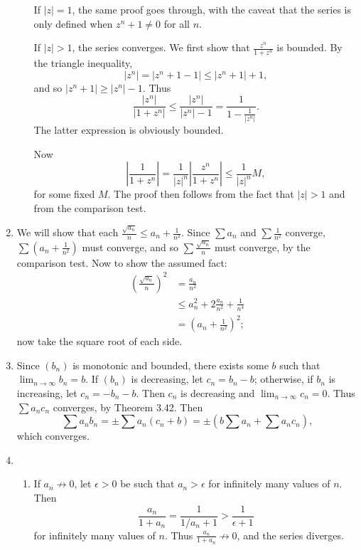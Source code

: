 \documentclass{article}
\begin{document}
\begin{enumerate}[label=\textbf{\arabic*.}]
\begin{enumerate}
If $|z| = 1$, the same proof goes through, with the caveat that the series is only defined when $z^n + 1 \neq 0$ for all $n$.

If $|z| > 1$, the series converges. We first show that $\frac{z^n}{1+z^n}$ is bounded. By the triangle inequality, \[|z^n| = |z^n + 1 - 1| \leq |z^n + 1| + 1,\] and so $|z^n + 1| \geq |z^n| - 1$. Thus \[\frac{|z^n|}{|1+z^n|} \leq \frac{|z^n|}{|z^n| - 1} = \frac{1}{1 - \frac{1}{|z^n|}}.\] The latter expression is obviously bounded.

Now \[\left|\frac{1}{1+z^n}\right| = \frac{1}{|z|^n}\left|\frac{z^n}{1+z^n}\right| \leq \frac{1}{|z|^n} M,\] for some fixed $M$. The proof then follows from the fact that $|z| > 1$ and from the comparison test.
\end{enumerate}
\setcounter{enumi}{6}
\item We will show that each $\frac{\sqrt{a_n}}{n} \leq a_n + \frac{1}{n^2}$. Since $\sum a_n$ and $\sum \frac{1}{n^2}$ converge, $\sum \left(a_n + \frac{1}{n^2}\right)$ must converge, and so $\sum\frac{\sqrt{a_n}}{n}$ must converge, by the comparison test.
Now to show the assumed fact:\begin{align*}
\left(\frac{\sqrt{a_n}}{n}\right)^2 &= \frac{a_n}{n^2}\\
	&\leq a_n^2 + 2\frac{a_n}{n^2} + \frac{1}{n^4}\\
	&= \left(a_n+\frac{1}{n^2}\right)^2 ;
\end{align*}
now take the square root of each side.
\item Since $(b_n)$ is monotonic and bounded, there exists some $b$ such that $\lim_{n\to\infty} b_n = b$. If $(b_n)$ is decreasing, let $c_n = b_n - b$; otherwise, if $b_n$ is increasing, let $c_n = -b_n - b$. Then $c_n$ is decreasing and $\lim_{n\to\infty} c_n = 0$. Thus $\sum a_n c_n$ converges, by Theorem 3.42. Then \[\sum a_n b_n = \pm \sum a_n (c_n + b) = \pm \left(b\sum a_n + \sum a_n c_n\right),\] which converges.
\setcounter{enumi}{10}
\item \begin{enumerate}
\item If $a_n\not\to 0$, let $\epsilon > 0$ be such that $a_n > \epsilon$ for infinitely many values of $n$. Then \[\frac{a_n}{1+a_n} = \frac{1}{1/a_n+1} > \frac{1}{\epsilon+1}\] for infinitely many values of $n$. Thus $\frac{a_n}{1+a_n}\not\to 0$, and the series diverges.


\end{enumerate}
\end{enumerate}
\end{document}
